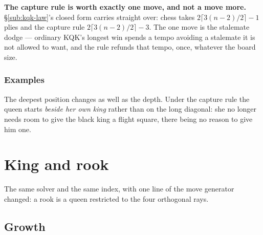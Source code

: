 \documentclass[10pt]{article}
\begin{document}
\smallskip
\noindent
\textbf{The capture rule is worth exactly one move, and not a move more.}
\S\ref{sub:kqk-law}'s closed form carries straight over: chess takes
$2\lceil 3(n-2)/2\rceil-1$ plies and the capture rule
$2\lceil 3(n-2)/2\rceil-3$. The one move is the stalemate dodge --- ordinary
KQK's longest win spends a tempo avoiding a stalemate it is not allowed to
want, and the rule refunds that tempo, once, whatever the board size.

\subsubsection{Examples}\label{sub:kqk-cap-pos}

\medskip
\noindent
\begin{minipage}[t]{0.32\textwidth}
\end{minipage}\hfill
\begin{minipage}[t]{0.32\textwidth}
\end{minipage}\hfill
\begin{minipage}[t]{0.32\textwidth}\vspace{0pt}\small
The deepest position changes as well as the depth. Under the capture rule the
queen starts \emph{beside her own king} rather than on the long diagonal: she
no longer needs room to give the black king a flight square, there being no
reason to give him one.
\end{minipage}

\section{King and rook}\label{sec:krk}

\noindent
The same solver and the same index, with one line of the move generator
changed: a rook is a queen restricted to the four orthogonal rays.

\subsection{Growth}\label{sub:krk-growth}
\end{document}
